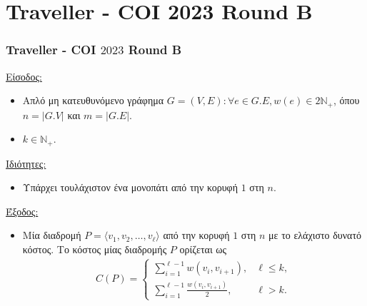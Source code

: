 \documentclass[t]{beamer}
\begin{document}

\section{Traveller  - COI 2023 Round B}

\begin{frame}
	\frametitle{Traveller  - COI $2023$ Round B}
	\underline{Είσοδος:}
	\pause
	\vspace{0.25cm} 
	\begin{itemize}
		\item Απλό μη κατευθυνόμενο γράφημα $G = (V, E) : \forall e \in G.E, w(e) \in 2\mathbb{N}_+$, όπου $n = |G.V|$ και $m = |G.E|$.
		\pause
		\item $k \in \mathbb{N}_+$.
	\end{itemize}
	\pause
	\underline{Ιδιότητες:}
	\pause
	\vspace{0.25cm}
	\begin{itemize}
		\item Υπάρχει τουλάχιστον ένα μονοπάτι από την κορυφή $1$ στη $n$.
	\end{itemize}
	\pause
	\vspace{0.25cm} 
	\underline{Έξοδος:}
	\pause
	\vspace{0.25cm} 
	\begin{itemize}
		\item Μία διαδρομή $P = \langle v_1, v_2, \dots, v_{\ell}\rangle$ από την κορυφή $1$ στη $n$ με το ελάχιστο δυνατό κόστος. Το κόστος μίας διαδρομής $P$ ορίζεται ως 
		\begin{align*}
			C(P) =
			\begin{cases}
				\displaystyle\sum_{i = 1}^{\ell - 1} w(v_i, v_{i + 1}), & \ell \leq k, \\
				\displaystyle\sum_{i = 1}^{\ell - 1} \frac{w(v_i, v_{i + 1})}{2}, & \ell > k.
			\end{cases}
		\end{align*}
	\end{itemize}
\end{frame}
\end{document}
